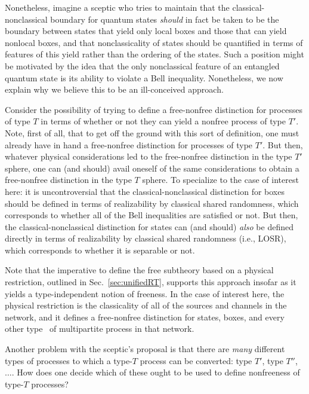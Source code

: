 \documentclass[prx,11pt,letterpaper,twocolumn,accepted=2023-11-27]{quantumarticle}
\theoremstyle{plain}
\theoremstyle{definition}
\begin{document}
Nonetheless, imagine a sceptic who tries to maintain that the classical-nonclassical boundary for quantum states {\em should} in fact be taken to be the boundary between states that yield only local boxes and those that can yield nonlocal boxes, and that nonclassicality of states should be quantified in terms of features of this yield rather than the ordering of the states. 
Such a position might be motivated by the idea that 
the only nonclassical feature of an entangled quantum state is its ability to violate a Bell inequality. Nonetheless, we now explain why we believe this to be an ill-conceived approach.

Consider the possibility of trying to define a free-nonfree distinction for processes of type $T$ in terms of whether or not they can yield a nonfree process of type $T'$.  Note, first of all, that to get off the ground with this sort of definition, one must already have in hand a free-nonfree distinction for processes of type $T'$.  But then, whatever physical considerations led to the free-nonfree distinction in the type $T'$ sphere, one can (and should) avail oneself of the 
  same considerations to obtain a free-nonfree distinction in the type $T$ sphere. To specialize to the case of interest here: it is uncontroversial that the classical-nonclassical distinction for boxes should be defined in terms of realizability by classical shared randomness, which corresponds to whether all of the Bell inequalities are satisfied or not.  But then, the classical-nonclassical distinction for states can (and should) {\em also} be defined directly in terms of realizability by classical shared randomness (i.e., LOSR), which corresponds to whether it is separable or not. 
 
    
Note that the imperative to define 
 the free subtheory based on a physical restriction, outlined in Sec.~\ref{sec:unifiedRT}, supports this approach insofar as it yields a type-independent notion of freeness.  In the case of interest here, the physical restriction is the classicality of all of the sources and channels in the network, 
  and it defines a free-nonfree distinction for states, boxes, and every other type~\cite{semiquantum,rosset2020characterizing} of multipartite process in that network. 

Another problem with the sceptic's proposal is that there are {\em many} different types of processes to which a type-$T$ process can be converted: type $T'$, type $T''$, $\dots$.
How does one decide which of these ought to be used to define nonfreeness of type-$T$ processes?
\end{document}
